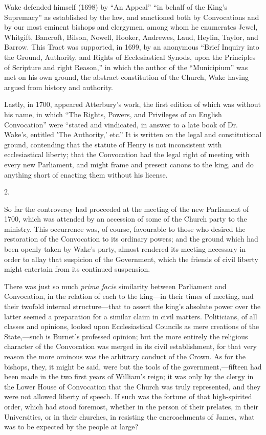 Wake defended himself (1698)
by ``An Appeal'' ``in behalf of the King's Supremacy'' as established by
the law, and sanctioned both by Convocations and by our most eminent
bishops and clergymen, among whom he enumerates Jewel, Whitgift,
Bancroft, Bilson, Nowell, Hooker, Andrewes, Laud, Heylin, Taylor, and
Barrow. This Tract was supported, in 1699, by an anonymous ``Brief
Inquiry into the Ground, Authority, and Rights of Ecclesiastical
Synods, upon the Principles of Scripture and right Reason,'' in which
the author of the ``Municipium'' was met on his own ground, the abstract
constitution of the Church, Wake having argued from history and
authority.

Lastly, in 1700, appeared
Atterbury's work, the first edition of which was without his name, in
which ``The Rights, Powers, and Privileges of an English Convocation''
were ``stated and vindicated, in answer to a late book of Dr. Wake's,
entitled 'The Authority,' etc.'' It is written on the legal and
constitutional ground, contending that the statute of Henry is not
inconsistent with ecclesiastical liberty; that the Convocation had the
legal right of meeting with every new Parliament, and might frame and
present canons to the king, and do anything short of enacting them
without his license.

2.

So far the controversy had
proceeded at the meeting of the new Parliament of 1700, which was
attended by an accession of some of the Church party to the ministry.
This occurrence was, of course, favourable to those who desired the
restoration of the Convocation to its ordinary powers; and the ground
which had been openly taken by Wake's party, almost rendered its
meeting necessary in order to allay that suspicion of the Government,
which the friends of civil liberty might entertain from its continued
suspension.

There was just so much \emph{prima
facie} similarity between Parliament and Convocation, in the
relation of each to the king—in their times of meeting, and their
twofold internal structure—that to assert the king's absolute power over the latter seemed a preparation for a similar claim in
civil matters. Politicians, of all classes and opinions, looked upon
Ecclesiastical Councils as mere creations of the State,—such is
Burnet's professed opinion; but the more entirely the religious
character of the Convocation was merged in its civil establishment,
for that very reason the more ominous was the arbitrary conduct of the
Crown. As for the bishops, they, it might be said, were but the tools
of the government,—fifteen had been made in the two first years of
William's reign; it was only by the clergy in the Lower House of
Convocation that the Church was truly represented, and they were not
allowed liberty of speech. If such was the fortune of that
high-spirited order, which had stood foremost, whether in the person
of their prelates, in their Universities, or in their churches, in
resisting the encroachments of James, what was to be expected by the
people at large?

